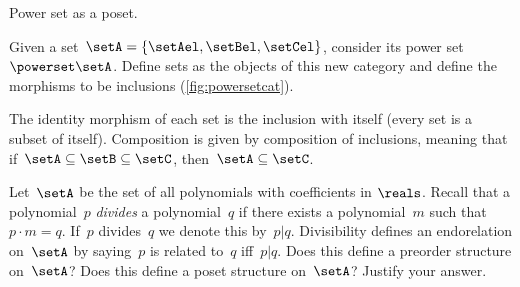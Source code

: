 \begin{marginfigure}
    \centering
    \caption{Power set as a poset.}
    \label{fig:powersetcat}
\end{marginfigure}

\begin{example}
    \label{ex:hasseinclusion}
    Given a set~$\setA=\{\setAel,\setBel,\setCel\}$, consider its power set~$\powerset\setA$.
    Define sets as the objects of this new category and define the morphisms to be inclusions (\cref{fig:powersetcat}).

    The identity morphism of each set is the inclusion with itself (every set is a subset of itself).
    Composition is given by composition of inclusions, meaning that if~$\setA\subseteq \setB \subseteq \setC$, then~$\setA\subseteq \setC$.
\end{example}

\vfill
%

\begin{gradedexercise}
    \label{ex:PolynomialDivisibility}
    Let~$\setA$ be the set of all polynomials with coefficients in $\reals$.
    Recall that a polynomial~$p$ \emph{divides} a polynomial~$q$ if there exists a polynomial~$m$ such that~$p \cdot m = q$.
    If~$p$ divides~$q$ we denote this by~$p \vert q$.
    Divisibility defines an endorelation on~$\setA$ by saying~$p$ is related to~$q$ iff~$p \vert q$.
    Does this define a preorder structure on~$\setA$?
    Does this define a poset structure on~$\setA$?
    Justify your answer.
\end{gradedexercise}


